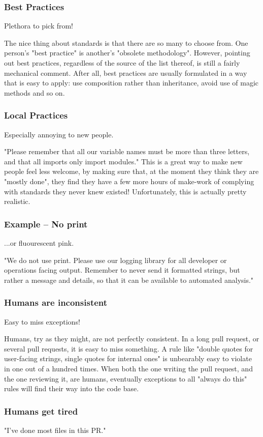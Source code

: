 \begin{frame}
\frametitle{Best Practices}
Plethora to pick from!
\end{frame}

The nice thing about standards is that there are so many to choose from.
One person's "best practice"
is another's "obsolete methodology".
However,
pointing out best practices,
regardless of the source of the list thereof,
is still a fairly mechanical comment.
After all,
best practices are usually formulated in a way that is easy to apply:
use composition rather than inheritance,
avoid use of magic methods
and so on.

\begin{frame}
\frametitle{Local Practices}
Especially annoying to new people.
\end{frame}

"Please remember that all our variable names must be more than
three letters,
and that all imports only import modules."
This is a great way to make new people feel less welcome,
by making sure that,
at the moment they think they are "mostly done",
they find they have a few more hours of make-work
of complying with standards they never knew existed!
Unfortunately, this is actually pretty realistic.

\begin{frame}
\frametitle{Example -- No print}
...or fluourescent pink.
\end{frame}

"We do not use print.
Please use our logging library for all developer or operations facing
output.
Remember to never send it formatted strings,
but rather a message and details,
so that it can be available to automated analysis."

\begin{frame}
\frametitle{Humans are inconsistent}
Easy to miss exceptions!
\end{frame}

Humans,
try as they might,
are not perfectly consistent.
In a long pull request,
or several pull requests,
it is easy to miss something.
A rule like
"double quotes for user-facing strings,
single quotes for internal ones"
is unbearably easy to violate in one out of a hundred times.
When both the one writing the pull request,
and the one reviewing it,
are humans,
eventually exceptions to all "always do this"
rules will find their way into the code base.

\begin{frame}
\frametitle{Humans get tired}
"I've done most files in this PR."
\end{frame}

